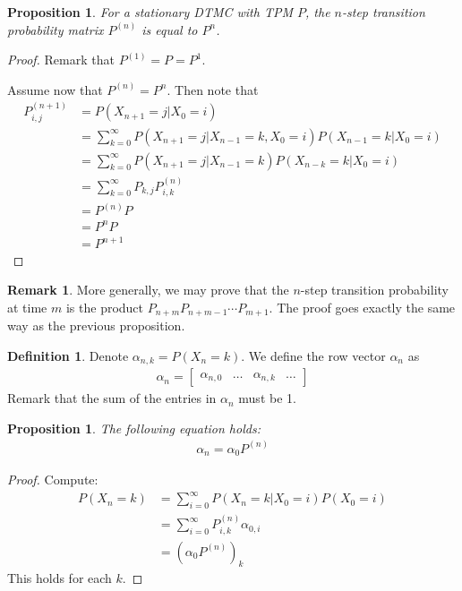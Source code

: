 \documentclass[11pt]{amsart}
\newtheorem{proposition}[theorem]{Proposition}
\theoremstyle{definition}
\newtheorem{definition}[theorem]{Definition}
\newtheorem{remark}[theorem]{Remark}
\numberwithin{equation}{section}
\begin{document}
 \begin{proposition}
     For a stationary DTMC with TPM $P$, the $n$-step transition probability matrix $P^{(n)}$ is equal to $P^n$.
 \end{proposition}
 \begin{proof}
     Remark that $P^{(1)}=P=P^1$.

     Assume now that $P^{(n)}=P^n$. Then note that
     \begin{align*}
         P^{(n+1)}_{i,j}&=P(X_{n+1}=j|X_0=i)\\
         &=\sum_{k=0}^{\infty}P(X_{n+1}=j|X_{n-1}=k,X_0=i)P(X_{n-1}=k|X_0=i)\\
         &=\sum_{k=0}^{\infty}P(X_{n+1}=j|X_{n-1}=k)P(X_{n-k}=k|X_0=i)\\
         &=\sum_{k=0}^\infty P_{k,j}P^{(n)}_{i,k}\\
         &=P^{(n)}P\\
         &=P^{n}P\\
         &=P^{n+1}
     \end{align*}
 \end{proof}
 \begin{remark}
     More generally, we may prove that the $n$-step transition probability at time $m$ is the product $P_{n+m}P_{n+m-1}\cdots P_{m+1}$. The proof goes exactly the same way as the previous proposition.
 \end{remark}
 \begin{definition}
     Denote $\alpha_{n,k}=P(X_n=k)$. We define the row vector $\alpha_n$ as
     \begin{align*}
         \alpha_n=\begin{bmatrix}
             \alpha_{n,0} & \ldots & \alpha_{n,k} & \ldots
         \end{bmatrix}
     \end{align*}
     Remark that the sum of the entries in $\alpha_n$ must be 1.
 \end{definition}
 \begin{proposition}
     The following equation holds:
     \begin{align*}
         \alpha_n=\alpha_0P^{(n)}
     \end{align*}
 \end{proposition}
 \begin{proof}
     Compute:
     \begin{align*}
         P(X_n=k)&=\sum_{i=0}^\infty P(X_n=k|X_0=i)P(X_0=i)\\
         &=\sum_{i=0}^\infty P^{(n)}_{i,k}\alpha_{0,i}\\
         &=(\alpha_0P^{(n)})_k
     \end{align*}
     This holds for each $k$.
 \end{proof}
\end{document}
